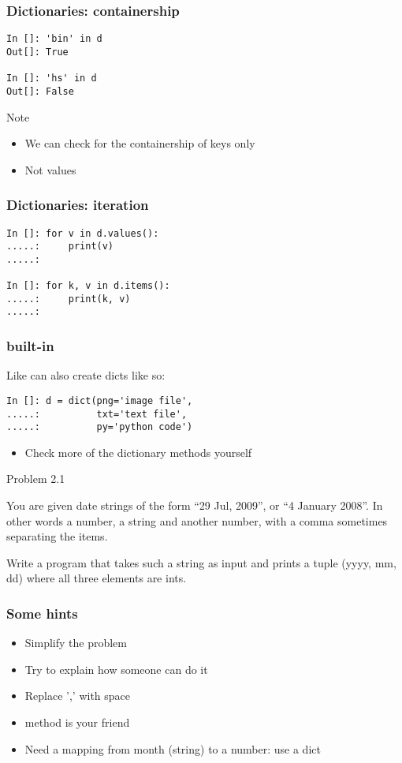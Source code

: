 \documentclass[14pt,compress]{beamer}
\begin{document}
\begin{frame}[fragile]
  \frametitle{Dictionaries: containership}
  \begin{lstlisting}
In []: 'bin' in d
Out[]: True

In []: 'hs' in d
Out[]: False
  \end{lstlisting}
  \begin{block}{Note}
    \begin{itemize}
      \item We can check for the containership of keys only
      \item Not values
    \end{itemize}
  \end{block}
\end{frame}

\begin{frame}[fragile]
  \frametitle{Dictionaries:  iteration}
  \begin{lstlisting}
In []: for v in d.values():
.....:     print(v)
.....:

In []: for k, v in d.items():
.....:     print(k, v)
.....:
  \end{lstlisting}
\end{frame}

\begin{frame}[fragile]
  \frametitle{ built-in}
Like  can also create dicts like so:
\begin{lstlisting}
In []: d = dict(png='image file',
.....:          txt='text file',
.....:          py='python code')
\end{lstlisting}
\begin{itemize}
\item Check more of the dictionary methods yourself
\end{itemize}
\end{frame}

\begin{frame} {Problem 2.1}

  You are given date strings of the form ``29 Jul, 2009'', or ``4 January
  2008''. In other words a number, a string and another number, with a comma
  sometimes separating the items.

  Write a program that takes such a string as input and prints a tuple (yyyy,
  mm, dd) where all three elements are ints.
\end{frame}

\begin{frame}[fragile]
  \frametitle{Some hints}
  \begin{itemize}
  \item Simplify the problem
  \item Try to explain how someone can do it
    \vspace*{2em}

  \item Replace ',' with space
  \item {} method is your friend
  \item Need a mapping from month (string) to a number: use a dict
  \end{itemize}
\end{frame}
\end{document}

